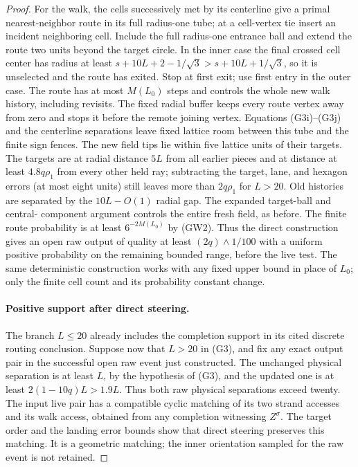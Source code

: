 \begin{proof}
For the walk, the cells successively met by its centerline give a primal
nearest-neighbor route in its full radius-one tube; at a cell-vertex tie
insert an incident neighboring cell.  Include the full radius-one entrance
ball and extend the route two units beyond the target circle.  In the inner
case the final crossed cell center has radius at least
\(s+10L+2-1/\sqrt3>s+10L+1/\sqrt3\), so it is unselected and the route
has exited.  Stop at first exit; use first entry in the outer case.  The
route has at most \(M(L_0)\) steps and controls the whole new walk history,
including revisits.  The fixed radial buffer keeps every route vertex away
from zero and stops it before the remote joining vertex.  Equations
(G3i)--(G3j) and the centerline separations
leave fixed lattice room between this tube and the finite sign fences.
The new field tips lie within five lattice units of their targets.  The
targets are at radial distance \(5L\) from all earlier pieces and at
distance at least \(4.8q\rho_1\) from every other held ray; subtracting
the target, lane, and hexagon errors (at most eight units) still leaves
more than \(2q\rho_1\) for \(L>20\).  Old histories are separated by
the \(10L-O(1)\) radial gap.  The expanded target-ball and central-
component argument controls the entire fresh field, as before.  The
finite route probability is at least \(6^{-2M(L_0)}\) by (GW2).
Thus the direct construction gives an open raw output of quality at least
\((2q)\wedge1/100\) with a uniform positive probability on the remaining
bounded range, before the live test.  The same deterministic construction
works with any fixed upper bound in place of \(L_0\); only the finite
cell count and its probability constant change.

\paragraph{Positive support after direct steering.}
The branch \(L\le20\) already includes the completion support in its
cited discrete routing conclusion.  Suppose now that \(L>20\) in (G3),
and fix any exact output pair in the successful open raw event just
constructed.  The unchanged physical separation is at least \(L\), by
the hypothesis of (G3), and the updated one is at least
\(2(1-10q)L>1.9L\).  Thus both raw physical separations exceed twenty.
The input live pair has a compatible cyclic matching of its two strand
accesses and its walk access, obtained from any completion witnessing
\(Z^\sigma\).  The target order and the landing error bounds show that
direct steering preserves this matching.  It is a geometric matching;
the inner orientation sampled for the raw event is not retained.


\end{proof}

